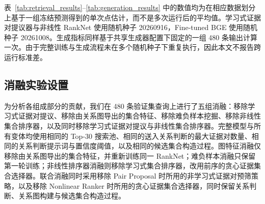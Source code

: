 表~\ref{tab:retrieval_results}--\ref{tab:generation_results} 中的数值均为在相应数据划分上基于一组冻结预测得到的单次点估计，而不是多次运行后的平均值。学习式证据对提议器与非线性 RankNet 使用随机种子 20260916，Fine-tuned BGE 使用随机种子 20261008。生成指标同样基于共享生成器配置下固定的一组 480 条输出计算一次。由于完整训练与生成流程未在多个随机种子下重复执行，因此本文不报告跨运行标准差。

\subsection{消融实验设置}

为分析各组成部分的贡献，我们在 480 条验证集查询上进行了五组消融：移除学习式证据对提议、移除由关系图导出的集合特征、移除难负样本挖掘、移除非线性集合排序器，以及同时移除学习式证据对提议与非线性集合排序器。完整模型与所有变体均使用相同的 Top-30 搜索池、相同的送入关系判断的最大证据对数量、相同的关系判断提示词与置信度阈值，以及相同的候选集合构造过程。图特征消融仅移除由关系图导出的集合特征，并重新训练同一 RankNet；难负样本消融只保留第一轮训练；非线性排序器消融则移除学习式集合排序器，改用前序的贪心证据集合选择器。联合消融同时采用移除 Pair Proposal 时所用的非学习式证据对预筛策略，以及移除 Nonlinear Ranker 时所用的贪心证据集合选择器，同时保留关系判断、关系图构建与候选集合构造过程。
